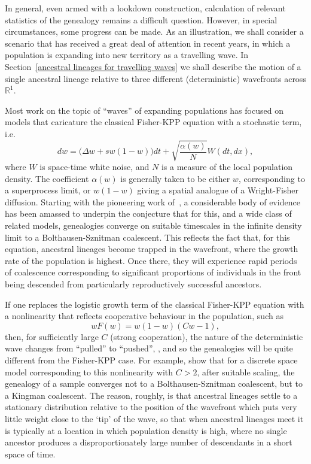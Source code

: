 \documentclass[EJP]{ejpecp} %
\newcommand{\IR}{\mathbb R}
\newcommand{\citet}[1]{\cite{#1}}
\newcommand{\citep}[1]{\cite{#1}}
\begin{document}
In general, even armed with a lookdown construction, calculation of relevant statistics 
of the genealogy remains a difficult question. 
However, in special
circumstances, some progress can be made. As an illustration, 
we shall consider a scenario that
has received a great deal of attention in recent years, in which 
a population is expanding into new territory as a travelling wave. 
In Section~\ref{ancestral lineages for travelling waves}
we shall describe the motion of a single ancestral lineage relative to
three different (deterministic) wavefronts across $\IR^1$.

Most work on the topic of ``waves'' of expanding populations
has focused on models that caricature the classical Fisher-KPP equation with a 
stochastic term, i.e.
$$dw=\big(\Delta w +sw(1-w)\big)dt +\sqrt{\frac{\alpha(w)}{N}}W(dt,dx),$$
where $W$ is space-time white noise, and $N$ is a measure of the 
local population density. The coefficient
$\alpha(w)$ is generally taken to be either
$w$, corresponding to a superprocess limit, or $w(1-w)$ giving a 
spatial analogue of a Wright-Fisher diffusion. 
Starting with the pioneering work of~\cite{brunet/derrida/mueller/munier:2006},
a considerable body of evidence has been amassed to underpin the
conjecture that for this, and a wide class of related models, 
genealogies converge on suitable timescales in the infinite density limit
to a Bolthausen-Sznitman coalescent. %
This reflects the fact that, for this equation, 
ancestral lineages become trapped in 
the wavefront, where the growth rate of the population is highest. 
Once there, they will experience 
rapid periods of coalescence 
corresponding to significant proportions of individuals in the front being 
descended from particularly reproductively successful ancestors. 

If one replaces the logistic growth term of the classical
Fisher-KPP equation with a nonlinearity that reflects cooperative
behaviour in the population, such as
\begin{equation}
	\label{Birzu nonlinearity}
	wF(w)=w(1-w)(Cw-1),
\end{equation}
then, for sufficiently large $C$ (strong cooperation),
the nature of the deterministic
wave changes from ``pulled'' to ``pushed'',
\citep{birzu/hallatschek/korolev:2017, birzu/hallatschek/korolev:2021},
and so the genealogies will be quite different from the Fisher-KPP case. 
For example, \citet{etheridge/penington:2022}
show that for a discrete space model corresponding to this 
nonlinearity with $C>2$, after suitable scaling, the genealogy of a
sample converges not to a Bolthausen-Sznitman coalescent, but to
a Kingman coalescent. 
The reason, roughly, is that ancestral lineages
settle to a stationary distribution relative to the position of the 
wavefront which puts very little weight close to the `tip' of the wave, so
that when ancestral lineages meet
it is typically at a location in which population density is
high, where no single ancestor produces a disproportionately large number of 
descendants in a short space of time. 
\end{document}

